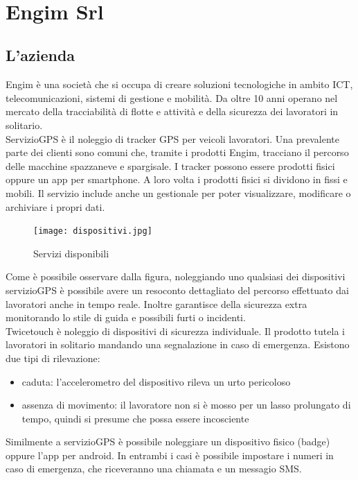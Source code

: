 \documentclass[12pt]{article}
\begin{document}
\thispagestyle{empty}
\newpage 
\thispagestyle{empty}
\
\newpage

\section{Engim Srl}
\subsection{L'azienda}
Engim è una società che si occupa di creare soluzioni tecnologiche in ambito 
ICT, telecomunicazioni, sistemi di gestione e mobilità. Da oltre 10 anni operano 
nel mercato della tracciabilità di flotte e attività e della 
sicurezza dei lavoratori in solitario.
\\ ServizioGPS è il noleggio di tracker GPS per veicoli lavoratori. 
Una prevalente parte dei clienti sono comuni che, tramite i prodotti Engim, 
tracciano il percorso delle macchine spazzaneve e spargisale.
I tracker possono essere prodotti fisici oppure un app per smartphone. A loro 
volta i prodotti fisici si dividono in fissi e mobili. Il servizio include
anche un gestionale per poter visualizzare, modificare o archiviare i propri dati.

\begin{figure}[H]
\texttt{[image: dispositivi.jpg]}
\centering
\caption{Servizi disponibili}
\end{figure}
Come è possibile osservare dalla figura, noleggiando uno qualsiasi dei dispositivi 
servizioGPS è possibile avere un resoconto dettagliato del percorso effettuato 
dai lavoratori anche in tempo reale. 
Inoltre garantisce della sicurezza extra monitorando lo stile di guida e 
possibili furti o incidenti. 
\\ Twicetouch è noleggio di dispositivi di sicurezza individuale.
Il prodotto tutela i lavoratori in solitario mandando una segnalazione in caso di
emergenza. Esistono due tipi di rilevazione: 
\begin{itemize}
  \item caduta: l'accelerometro del dispositivo rileva un urto pericoloso
  \item assenza di movimento: il lavoratore non si è mosso per un lasso prolungato di tempo, 
  quindi si presume che possa essere incosciente
\end{itemize}
Similmente a servizioGPS è possibile noleggiare un dispositivo fisico (badge) oppure
l'app per android. In entrambi i casi è possibile impostare i numeri in caso di 
emergenza, che riceveranno una chiamata e un messagio SMS.
\end{document}
